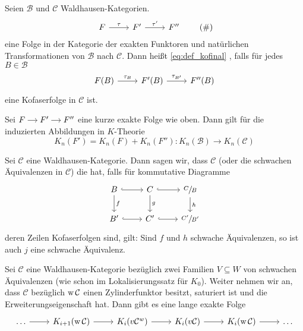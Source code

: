 \begin{definition}
	Seien $\mathcal{B}$ und $\mathcal{C}$ Waldhausen-Kategorien.
	\begin{equation}
		\begin{tikzcd}
			F \rar["\tau"] & F' \rar["\tau'"] & F''
		\end{tikzcd}
		\label{eq:def_kofinal}\tag{\#}
	\end{equation}
	eine Folge in der Kategorie der exakten Funktoren und natürlichen Transformationen von $\mathcal{B}$ nach $\mathcal{C}$.
	Dann heißt \eqref{eq:def_kofinal} , falls für jedes $B \in \mathcal{B}$ 
	\[
		\begin{tikzcd}
			F(B) \rar["\tau_B"] & F'(B) \rar["\tau_{B'}"] & F''(B)
		\end{tikzcd}
	\]
	eine Kofaserfolge in $\mathcal{C}$ ist.
\end{definition}

\begin{satz}[name={Additivitätssatz}]
	Sei \(
		\begin{tikzcd}[cramped,sep=small]
			F \rar & F' \rar & F''
		\end{tikzcd}
	\) eine kurze exakte Folge wie oben.
	Dann gilt für die induzierten Abbildungen in $K$-Theorie
	\[
		K_n(F') = K_n(F) + K_n(F'') \colon K_n(\mathcal{B}) \longrightarrow K_n(\mathcal{C})
	\]
\end{satz}

\begin{definition}
	Sei $\mathcal{C}$ eine Waldhausen-Kategorie.
	Dann sagen wir, dass $\mathcal{C}$ (oder die schwachen Äquivalenzen in $\mathcal{C}$) die  hat, falls für kommutative Diagramme 
	\[
		\begin{tikzcd}
			B \rar[hook] \dar["f"] & C \rar[hook] \dar["g"] & \sfrac{C}{B} \dar["h"] \\
			B' \rar[hook] & C' \rar[hook] & \sfrac{C'}{B'}
		\end{tikzcd}
	\]
	deren Zeilen Kofaserfolgen sind, gilt:
	Sind $f$ und $h$ schwache Äquivalenzen, so ist auch $j$ eine schwache Äquivalenz.
\end{definition}

\begin{satz}[name={Lokalisierungssatz}]
	Sei $\mathcal{C}$ eine Waldhausen-Kategorie bezüglich zwei Familien $V \subseteq W$ von schwachen Äquivalenzen (wie schon im Lokalisierungssatz für $K_0$).
	Weiter nehmen wir an, dass $\mathcal{C}$ bezüglich $\operatorname{w} \mathcal{C}$ einen Zylinderfunktor besitzt, saturiert ist und die Erweiterungseigenschaft hat.
	Dann gibt es eine lange exakte Folge
	\[
		\begin{tikzcd}
			\ldots \rar & K_{i+1}(\wOp \mathcal{C}) \rar & K_i (v \mathcal{C}^w) \rar & K_i(v \mathcal{C}) \rar & K_i(\wOp \mathcal{C}) \rar & \ldots 
		\end{tikzcd}
	\]
\end{satz}


